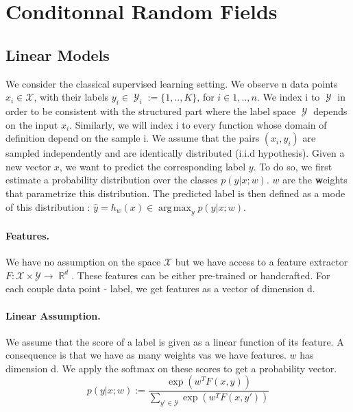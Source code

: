 \documentclass{article}
\DeclareMathOperator{\R}{\mathbb{R}}
\DeclareMathOperator{\1}{\mathbb{1}}
\DeclareMathOperator{\Y}{\mathcal{Y}}
\DeclareMathOperator*{\argmax}{arg\,max}
\begin{document}
\clearpage
\tableofcontents
\clearpage

\section{Conditonnal Random Fields}

\subsection{Linear Models}

We consider the classical supervised learning setting.
We observe n data points $x_i \in \mathcal{X}$, with their labels $y_i\in \Y_i:= \{1,..,K\}$, for $i \in {1,..,n}$.
We index i to $\Y$ in order to be consistent with the structured part where the label space $\Y$ depends on the input $x_i$.
Similarly, we will index i to every function whose domain of definition depend on the sample i.
We assume that the pairs $(x_i, y_i)$ are sampled independently and are identically distributed (i.i.d hypothesis).
Given a new vector $x$, we want to predict the corresponding label $y$. 
To do so, we first estimate a probability distribution over the classes $p(y|x ; w)$.
$w$ are the \textbf{w}eights that parametrize this distribution. 
The predicted label is then defined as a mode of this distribution : $\hat y = h_w(x) \in \argmax_y p(y| x ; w)$.

\paragraph{Features.}
We have no assumption on the space $\mathcal X$ but we have access to a feature extractor $F:\mathcal X \times \mathcal Y \rightarrow \R^d$.
These features can be either pre-trained or handcrafted.
For each couple data point - label, we get features as a vector of dimension d.

\paragraph{Linear Assumption.}
We assume that the score of a label is given as a linear function of its feature.
A consequence is that we have as many weights vas we have  features.
$w$ has dimension d.
We apply the softmax on these scores to get a probability vector. 
\begin{equation}
	\label{primal probability}
	p(y | x ; w) := \frac{\exp(w^TF(x, y))}{\sum_{y' \in \mathcal{Y}} \exp(w^TF(x, y'))}
\end{equation}
\end{document}

